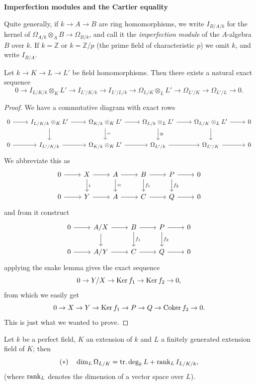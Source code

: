 \medskip
\noindent\textbf{Imperfection modules and the Cartier equality}

Quite generally, if $k \to A \to B$ are ring homomorphisms, we write $I_{B/A/k}$ for
the kernel of $\Omega_{A/k} \otimes_A B \to \Omega_{B/k}$, and call it the \emph{imperfection module} of
the $A$-algebra $B$ over $k$. If $k = \mathbb{Z}$ or $k = \mathbb{Z}/p$ (the prime field of characteristic
$p$) we omit $k$, and write $I_{B/A}$.

\begin{lemma}\label{lem:26.1}
Let $k \to K \to L \to L'$ be field homomorphisms. Then there exists a natural
exact sequence
\[
  0 \to I_{L/K/k} \otimes_K L' \to I_{L'/K/k} \to I_{L'/L/k}
      \to \Omega_{L/K} \otimes_L L' \to \Omega_{L'/K} \to \Omega_{L'/L} \to 0.
\]
\end{lemma}

\begin{proof}
We have a commutative diagram with exact rows
\[
\begin{tikzcd}
0 \arrow[r] & I_{L/K/k} \otimes_K L' \arrow[r] \arrow[d] &
\Omega_{K/k} \otimes_K L' \arrow[r] \arrow[d, "="] &
\Omega_{L/k} \otimes_L L' \arrow[r] \arrow[d, "\cong"] &
\Omega_{L/K} \otimes_L L' \arrow[r] \arrow[d] & 0 \\
0 \arrow[r] & I_{L'/K/k} \arrow[r] &
\Omega_{K/k} \otimes_K L' \arrow[r] &
\Omega_{L'/k} \arrow[r] &
\Omega_{L'/K} \arrow[r] & 0
\end{tikzcd}
\]
We abbreviate this as
\[
\begin{tikzcd}
0 \arrow[r] & X \arrow[r] \arrow[d, "i"] & A \arrow[r] \arrow[d, "="] & B \arrow[r] \arrow[d, "f_1"] & P \arrow[r] \arrow[d, "f_2"] & 0 \\
0 \arrow[r] & Y \arrow[r] & A \arrow[r] & C \arrow[r] & Q \arrow[r] & 0
\end{tikzcd}
\]
and from it construct
\[
\begin{tikzcd}
0 \arrow[r] & A/X \arrow[r] \arrow[d] & B \arrow[r] \arrow[d, "f_1"] & P \arrow[r] \arrow[d, "f_2"] & 0 \\
0 \arrow[r] & A/Y \arrow[r] & C \arrow[r] & Q \arrow[r] & 0
\end{tikzcd}
\]
applying the snake lemma gives the exact sequence
\[
  0 \to Y/X \to \operatorname{Ker} f_1 \to \operatorname{Ker} f_2 \to 0,
\]
from which we easily get
\[
  0 \to X \to Y \to \operatorname{Ker} f_1 \to P \to Q \to \operatorname{Coker} f_2 \to 0.
\]
This is just what we wanted to prove.
\end{proof}

\begin{theorem}\label{thm:26.10}
Let $k$ be a perfect field, $K$ an extension of $k$ and $L$ a finitely generated
extension field of $K$; then
\[
  (*) \quad \dim_L \Omega_{L/K} = \operatorname{tr.deg}_k L + \operatorname{rank}_L I_{L/K/k},
\]
(where $\operatorname{rank}_L$ denotes the dimension of a vector space over $L$).
\end{theorem}


